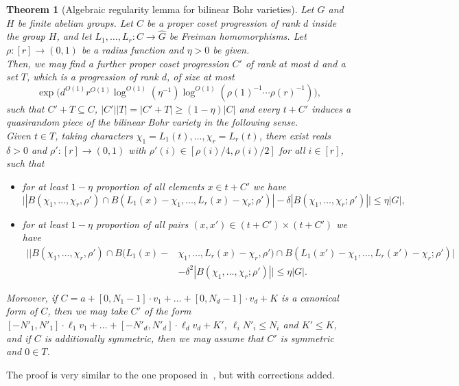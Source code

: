 \documentclass[a4paper,11pt]{article}
\newtheorem{theorem}{Theorem}
\numberwithin{theorem}{section}
\theoremstyle{definition}
\begin{document}
\begin{theorem}[Algebraic regularity lemma for bilinear Bohr varieties]\label{algreglemmaintro}Let $G$ and $H$ be finite abelian groups. Let $C$ be a proper coset progression of rank $d$ inside the group $H$, and let $L_1, \dots, L_r \colon C \to \hat{G}$ be Freiman homomorphisms. Let $\rho : [r] \to (0,1)$ be a radius function and $\eta > 0$ be given.\\
\indent Then, we may find a further proper coset progression $C'$ of rank at most $d$ and a set $T$, which is a progression of rank $d$, of size at most
\[\exp\Big(d^{O(1)} r^{O(1)} \log^{O(1)} (\eta^{-1}) \log^{O(1)} (\rho(1)^{-1}\cdots\rho(r)^{-1}) \Big),\]
such that $C' + T \subseteq C$, $|C'| |T| = |C' + T| \geq (1 - \eta) |C|$ and every $t + C'$ induces a quasirandom piece of the bilinear Bohr variety in the following sense.\\
\indent Given $t \in T$, taking characters $\chi_1 = L_1(t), \dots, \chi_r = L_r(t)$, there exist reals $\delta > 0$ and $\rho' : [r] \to (0,1)$ with $\rho'(i) \in [\rho(i)/4, \rho(i)/2]$ for all $i \in [r]$, such that
\begin{itemize}
\item[\textbf{(i)}] for at least $1 - \eta$ proportion of all elements $x \in t + C'$ we have 
\[\Big||B(\chi_1, \dots, \chi_r, \rho') \cap B(L_1(x)-\chi_1, \dots, L_r(x)-\chi_r; \rho')| - \delta |B(\chi_1, \dots, \chi_r; \rho')|\Big| \leq \eta |G|,\]
\item[\textbf{(ii)}] for at least $1 - \eta$ proportion of all pairs $(x, x') \in ( t + C') \times (t + C')$ we have
\begin{align*}\Big||B(\chi_1, \dots, \chi_r, \rho') \cap B(L_1(x)-&\chi_1, \dots, L_r(x)-\chi_r, \rho') \cap B(L_1(x')-\chi_1, \dots, L_r(x')-\chi_r; \rho')| \\
&- \delta^2 |B(\chi_1, \dots, \chi_r; \rho')|\Big| \leq \eta |G|.\end{align*}
\end{itemize}
Moreover, if $C = a + [0, N_1 -1 ] \cdot v_1 + \dots + [0, N_d - 1] \cdot v_d + K$ is a canonical form of $C$, then we may take $C'$ of the form $[-N'_1, N'_1] \cdot \ell_1 v_1 + \dots + [-N'_d, N'_d] \cdot \ell_d v_d + K'$, $\ell_i N'_i \leq N_i$ and $K' \leq K$, and if $C$ is additionally symmetric, then we may assume that $C'$ is symmetric and $0 \in T$.
\end{theorem}

The proof is very similar to the one proposed in~\cite{generalBilBog}, but with corrections added.
\end{document}
